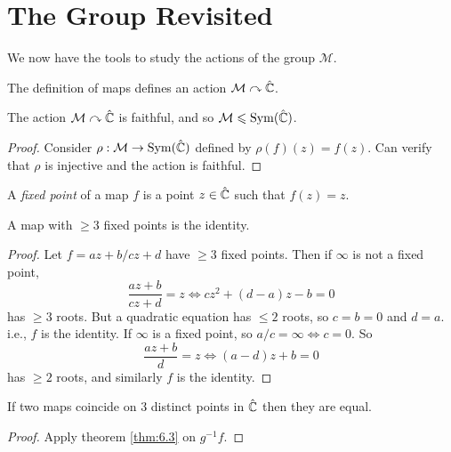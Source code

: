 \documentclass[10pt]{article}
\def\le{\leqslant}
\def\ge{\geqslant}
\DeclareMathOperator{\sym}{Sym}
\begin{document}
      \section{The \mobius Group Revisited}
      We now have the tools to study the actions of the \mobius group $ \mathcal{M} $.
      \begin{remark}
          The definition of \mobius maps defines an action $ {\mathcal{M}} \curvearrowright \hat{\mathbb{C}} $.
      \end{remark}
      \begin{proposition}\label{prop:6.1}
          The action $ {\mathcal{M}} \curvearrowright \hat{\mathbb{C}} $ is faithful, and so $ \mcM\le \sym(\hat{\bbC}) $.
      \end{proposition}
      \begin{proof}
          Consider $ \rho: \mcM \to \sym(\hat{\bbC}) $ defined by $ \rho(f)(z)=f(z) $. Can verify that $ \rho $ is injective and the action is faithful.
      \end{proof}
      \begin{definition}
          A \textit{fixed point} of a \mobius map $f$ is a point $z\in \hat{{\mathbb{C}}}$ such that $ f(z)=z $.
      \end{definition}
      \begin{theorem}\label{thm:6.3}
          A \mobius map with $\ge 3$ fixed points is the identity.
      \end{theorem}
      \begin{proof}
          Let $ f=az+b/cz+d $ have $\ge 3$ fixed points. Then if $\infty$ is not a fixed point,
          \[
             \frac{az+b}{cz+d}=z \Longleftrightarrow cz^2+(d-a)z-b=0
          \]
          has $\ge 3$ roots. But a quadratic equation has $\le 2$ roots, so $c=b=0$ and $d=a$. i.e., $f$ is the identity.
          If $\infty$ is a fixed point, so $ a/c=\infty \Leftrightarrow c=0 $. So 
          \[
              \frac{az+b}{d}=z \Longleftrightarrow (a-d)z+b=0
          \]
          has $\ge 2$ roots, and similarly $f$ is the identity.
      \end{proof}
      \begin{corollary}\label{col:6.4}
              If two \mobius maps coincide on 3 distinct points in $ \hat{{\mathbb{C}}} $ then they are equal.
      \end{corollary}
      \begin{proof}
          Apply theorem \ref{thm:6.3} on $g^{-1}f$.
      \end{proof}
\end{document}
